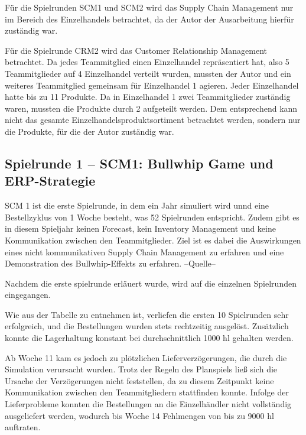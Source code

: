 \documentclass[a4paper,12pt]{article}
\begin{document}
Für die Spielrunden SCM1 und SCM2 wird das Supply Chain Management nur im Bereich des Einzelhandels betrachtet,
da der Autor der Ausarbeitung hierfür zuständig war.

Für die Spielrunde CRM2 wird das Customer Relationship Management betrachtet. Da jedes Teammitglied einen Einzelhandel repräsentiert hat, also 5 Teammitglieder auf 4 Einzelhandel verteilt wurden,
mussten der Autor und ein weiteres Teammitglied gemeinsam für Einzelhandel 1 agieren. Jeder Einzelhandel hatte bis zu 11 Produkte. Da in Einzelhandel 1 zwei Teammitglieder zuständig waren, mussten die Produkte durch 2 aufgeteilt werden.
Dem entsprechend kann nicht das gesamte Einzelhandelsproduktsortiment betrachtet werden, sondern nur die Produkte, für die der Autor zuständig war.

\subsection{Spielrunde 1 – SCM1: Bullwhip Game und ERP-Strategie}
SCM 1 ist die erste Spielrunde, in dem ein Jahr simuliert wird unnd eine Bestellzyklus von 1 Woche besteht, was 52 Spielrunden entspricht.
Zudem gibt es in diesem Spieljahr keinen Forecast, kein Inventory Management und keine Kommunikation zwischen den Teammitglieder.
Ziel ist es dabei die Auswirkungen eines nicht kommunikativen Supply Chain Management zu erfahren und eine Demonstration des Bullwhip-Effekts zu erfahren.
--Quelle--

Nachdem die  erste spielrunde erläuert wurde, wird auf die einzelnen Spielrunden eingegangen.

Wie aus der Tabelle zu entnehmen ist, verliefen die ersten 10 Spielrunden sehr erfolgreich, und die Bestellungen wurden stets rechtzeitig ausgelöst.
Zusätzlich konnte die Lagerhaltung konstant bei durchschnittlich 1000 hl gehalten werden.

Ab Woche 11 kam es jedoch zu plötzlichen Lieferverzögerungen, die durch die Simulation verursacht wurden.
Trotz der Regeln des Planspiels ließ sich die Ursache der Verzögerungen nicht feststellen, da zu diesem Zeitpunkt keine Kommunikation zwischen den Teammitgliedern stattfinden konnte.
Infolge der Lieferprobleme konnten die Bestellungen an die Einzelhändler nicht vollständig ausgeliefert werden, wodurch bis Woche 14 Fehlmengen von bis zu 9000 hl auftraten.
\end{document}
